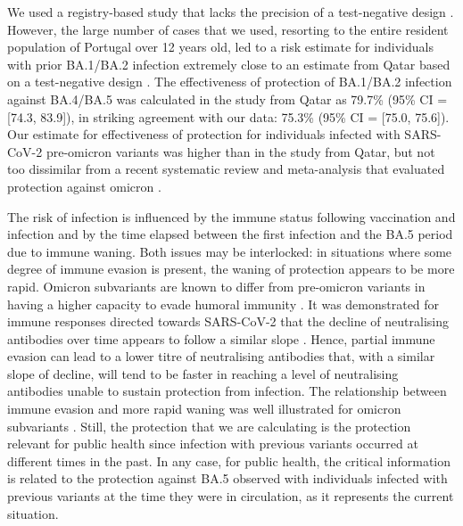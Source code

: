 We used a registry-based study that lacks the precision of a test-negative design \citep{ayoub2022EstimatingProtection}. However, the large number of cases that we used, resorting to the entire resident population of Portugal over 12 years old, led to a risk estimate for individuals with prior BA.1/BA.2 infection extremely close to an estimate from Qatar based on a test-negative design \citep{altarawneh2022ProtectionSARSCoV2}. The effectiveness of protection of BA.1/BA.2 infection against BA.4/BA.5 was calculated in the study from Qatar as 79.7\% (95\% CI = [74.3, 83.9]), in striking agreement with our data: 75.3\% (95\% CI = [75.0, 75.6]). Our estimate for effectiveness of protection for individuals infected with SARS-CoV-2 pre-omicron variants was higher than in the study from Qatar, but not too dissimilar from a recent systematic review and meta-analysis that evaluated protection against omicron \citep{forecastingteam2022SARSCoV2Infection}.

The risk of infection is influenced by the immune status following vaccination and infection and by the time elapsed between the first infection and the BA.5 period due to immune waning. Both issues may be interlocked: in situations where some degree of immune evasion is present, the waning of protection appears to be more rapid. Omicron subvariants are known to differ from pre-omicron variants in having a higher capacity to evade humoral immunity \citep{arora2022AugmentedNeutralisation, qu2022NeutralizationSARSCoV2, yu2022NeutralizationSARSCoV2, cao2022BA12}. It was demonstrated for immune responses directed towards SARS-CoV-2 that the decline of neutralising antibodies over time appears to follow a similar slope \citep{levin2021WaningImmune}. Hence, partial immune evasion can lead to a lower titre of neutralising antibodies that, with a similar slope of decline, will tend to be faster in reaching a level of neutralising antibodies unable to sustain protection from infection. The relationship between immune evasion and more rapid waning was well illustrated for omicron subvariants \citep{chemaitelly2022DurationImmune}. Still, the protection that we are calculating is the protection relevant for public health since infection with previous variants occurred at different times in the past. In any case, for public health, the critical information is related to the protection against BA.5 observed with individuals infected with previous variants at the time they were in circulation, as it represents the current situation.

